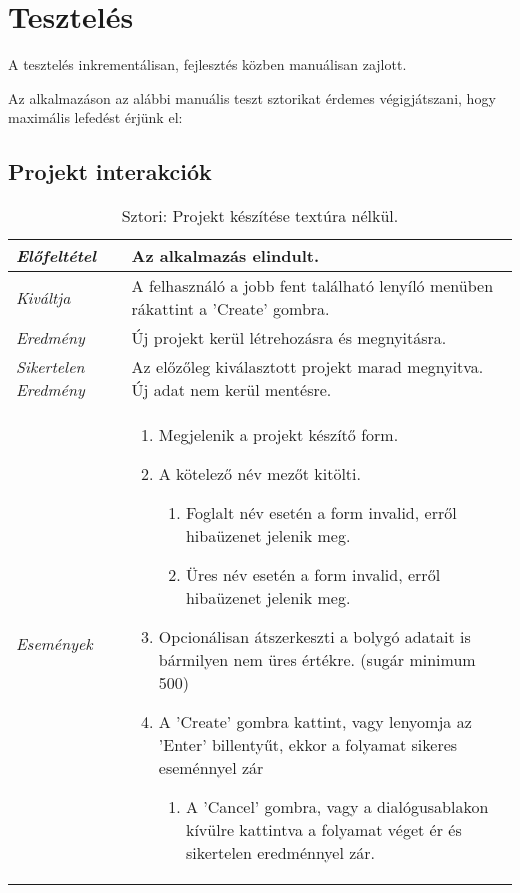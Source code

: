 \chapter{Tesztelés}
\label{ch:intro}

A tesztelés inkrementálisan, fejlesztés közben manuálisan zajlott.

Az alkalmazáson az alábbi manuális teszt sztorikat érdemes végigjátszani, hogy maximális lefedést érjünk el:

\section{Projekt interakciók}

\begin{table}[H]
	\centering
	\begin{tabular}{ | m{} | m{} | }
		\hline
		\emph{Előfeltétel} & Az alkalmazás elindult.  \\
		\hline
		\emph{Kiváltja} & A felhasználó a jobb fent található lenyíló menüben rákattint a 'Create' gombra. \\
		\hline
		\emph{Eredmény} & Új projekt kerül létrehozásra és megnyitásra.  \\
		\hline
		\emph{Sikertelen Eredmény} & Az előzőleg kiválasztott projekt marad megnyitva. Új adat nem kerül mentésre.  \\
		\hline
		\hline
		\emph{Események} &

		\begin{enumerate}[itemsep=-1ex]
			\item Megjelenik a projekt készítő form.
			\item A kötelező név mezőt kitölti.
			\begin{enumerate}[itemsep=-1ex]
				\item Foglalt név esetén a form invalid, erről hibaüzenet jelenik meg.
				\item Üres név esetén a form invalid, erről hibaüzenet jelenik meg.
			\end{enumerate}
			\item Opcionálisan átszerkeszti a bolygó adatait is bármilyen nem üres értékre. (sugár minimum 500)
			\item A 'Create' gombra kattint, vagy lenyomja az 'Enter' billentyűt, ekkor a folyamat sikeres eseménnyel zár
			\begin{enumerate}[itemsep=-1ex]
				\item A 'Cancel' gombra, vagy a dialógusablakon kívülre kattintva a folyamat véget ér és sikertelen eredménnyel zár.
			\end{enumerate}
		\end{enumerate}

		\\
		\hline
	\end{tabular}
	\caption{Sztori: Projekt készítése textúra nélkül.}
	\label{tab:story-project-create}
\end{table}

